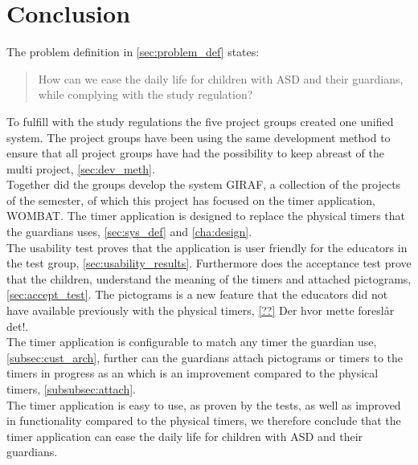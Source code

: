 \chapter{Conclusion}
The problem definition in \autoref{sec:problem_def} states:

\begin{quotation}
How can we ease the daily life for children with ASD and their guardians, while complying with the study regulation? 
\end{quotation}

To fulfill with the study regulations the five project groups created one unified system.
The project groups have been using the same development method to ensure that all project groups have had the possibility to keep abreast of the multi project, \autoref{sec:dev_meth}.\\

Together did the groups develop the system GIRAF, a collection of the projects of the semester, of which this project has focused on the timer application, WOMBAT.
The timer application is designed to replace the physical timers that the guardians uses, \autoref{sec:sys_def} and \autoref{cha:design}.\\

The usability test proves that the application is user friendly for the educators in the test group, \autoref{sec:usability_results}.
Furthermore does the acceptance test prove that the children, understand the meaning of the timers and attached pictograms, \autoref{sec:accept_test}. 
The pictograms is a new feature that the educators did not have available previously with the physical timers, \autoref{??} \textcolor[rgb]{1,0,0}{Der hvor mette foreslår det!}.\\

The timer application is configurable to match any timer the guardian use, \autoref{subsec:cust_arch}, further can the guardians attach pictograms or timers to the timers in progress as an which is an improvement compared to the physical timers, \autoref{subsubsec:attach}.\\ 

The timer application is easy to use, as proven by the tests, as well as improved in functionality compared to the physical timers, we therefore conclude that the timer application can ease the daily life for children with ASD and their guardians.\\



